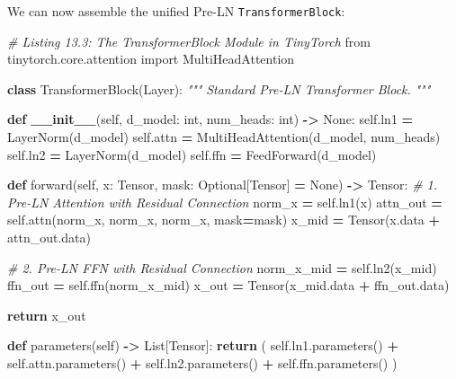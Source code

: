 \documentclass[
  letterpaper,
]{scrbook}
\newenvironment{Shaded}{\begin{snugshade}}{\end{snugshade}}
\newcommand{\BuiltInTok}[1]{#1}
\newcommand{\CommentTok}[1]{\textcolor[rgb]{0.56,0.35,0.01}{\textit{#1}}}
\newcommand{\ControlFlowTok}[1]{\textcolor[rgb]{0.13,0.29,0.53}{\textbf{#1}}}
\newcommand{\FunctionTok}[1]{\textcolor[rgb]{0.13,0.29,0.53}{\textbf{#1}}}
\newcommand{\ImportTok}[1]{#1}
\newcommand{\KeywordTok}[1]{\textcolor[rgb]{0.13,0.29,0.53}{\textbf{#1}}}
\newcommand{\NormalTok}[1]{#1}
\newcommand{\OperatorTok}[1]{\textcolor[rgb]{0.81,0.36,0.00}{\textbf{#1}}}
\newcommand{\VariableTok}[1]{\textcolor[rgb]{0.00,0.00,0.00}{#1}}
\begin{document}
We can now assemble the unified Pre-LN \texttt{TransformerBlock}:

\begin{Shaded}
\begin{Highlighting}[]
\CommentTok{\# Listing 13.3: The TransformerBlock Module in TinyTorch}
\ImportTok{from}\NormalTok{ tinytorch.core.attention }\ImportTok{import}\NormalTok{ MultiHeadAttention}

\KeywordTok{class}\NormalTok{ TransformerBlock(Layer):}
    \CommentTok{"""}
\CommentTok{    Standard Pre{-}LN Transformer Block.}
\CommentTok{    """}

    \KeywordTok{def} \FunctionTok{\_\_init\_\_}\NormalTok{(}\VariableTok{self}\NormalTok{, d\_model: }\BuiltInTok{int}\NormalTok{, num\_heads: }\BuiltInTok{int}\NormalTok{) }\OperatorTok{{-}\textgreater{}} \VariableTok{None}\NormalTok{:}
        \VariableTok{self}\NormalTok{.ln1 }\OperatorTok{=}\NormalTok{ LayerNorm(d\_model)}
        \VariableTok{self}\NormalTok{.attn }\OperatorTok{=}\NormalTok{ MultiHeadAttention(d\_model, num\_heads)}
        \VariableTok{self}\NormalTok{.ln2 }\OperatorTok{=}\NormalTok{ LayerNorm(d\_model)}
        \VariableTok{self}\NormalTok{.ffn }\OperatorTok{=}\NormalTok{ FeedForward(d\_model)}

    \KeywordTok{def}\NormalTok{ forward(}\VariableTok{self}\NormalTok{, x: Tensor, mask: Optional[Tensor] }\OperatorTok{=} \VariableTok{None}\NormalTok{) }\OperatorTok{{-}\textgreater{}}\NormalTok{ Tensor:}
        \CommentTok{\# 1. Pre{-}LN Attention with Residual Connection}
\NormalTok{        norm\_x }\OperatorTok{=} \VariableTok{self}\NormalTok{.ln1(x)}
\NormalTok{        attn\_out }\OperatorTok{=} \VariableTok{self}\NormalTok{.attn(norm\_x, norm\_x, norm\_x, mask}\OperatorTok{=}\NormalTok{mask)}
\NormalTok{        x\_mid }\OperatorTok{=}\NormalTok{ Tensor(x.data }\OperatorTok{+}\NormalTok{ attn\_out.data)}

        \CommentTok{\# 2. Pre{-}LN FFN with Residual Connection}
\NormalTok{        norm\_x\_mid }\OperatorTok{=} \VariableTok{self}\NormalTok{.ln2(x\_mid)}
\NormalTok{        ffn\_out }\OperatorTok{=} \VariableTok{self}\NormalTok{.ffn(norm\_x\_mid)}
\NormalTok{        x\_out }\OperatorTok{=}\NormalTok{ Tensor(x\_mid.data }\OperatorTok{+}\NormalTok{ ffn\_out.data)}

        \ControlFlowTok{return}\NormalTok{ x\_out}

    \KeywordTok{def}\NormalTok{ parameters(}\VariableTok{self}\NormalTok{) }\OperatorTok{{-}\textgreater{}}\NormalTok{ List[Tensor]:}
        \ControlFlowTok{return}\NormalTok{ (}
            \VariableTok{self}\NormalTok{.ln1.parameters() }\OperatorTok{+}
            \VariableTok{self}\NormalTok{.attn.parameters() }\OperatorTok{+}
            \VariableTok{self}\NormalTok{.ln2.parameters() }\OperatorTok{+}
            \VariableTok{self}\NormalTok{.ffn.parameters()}
\NormalTok{        )}
\end{Highlighting}
\end{Shaded}
\end{document}
